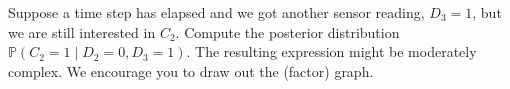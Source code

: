 \item {}
Suppose a time step has elapsed and we got another sensor reading, $D_3 = 1$,
but we are still interested in $C_2$. Compute the posterior distribution
$\mathbb P(C_2 = 1 \mid D_2 = 0, D_3 = 1)$. The resulting expression might be
moderately complex. We encourage you to draw out the (factor) graph.
